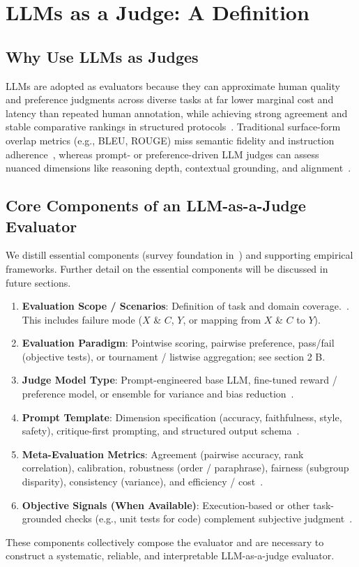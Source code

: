 \section{LLMs as a Judge: A Definition}

\subsection{Why Use LLMs as Judges}
LLMs are adopted as evaluators because they can approximate human quality and preference judgments across diverse tasks at far lower marginal cost and latency than repeated human annotation, while achieving strong agreement and stable comparative rankings in structured protocols~\cite{li2024_llmsasjudges, zheng2023judgelm, bavaresco2024judgebench}. Traditional surface-form overlap metrics (e.g., BLEU, ROUGE) miss semantic fidelity and instruction adherence~\cite{papineni2002bleu, lin2004rouge}, whereas prompt- or preference-driven LLM judges can assess nuanced dimensions like reasoning depth, contextual grounding, and alignment~\cite{fu2023gptscore, stiennon2020learning, ouyang2022training}.

\subsection{Core Components of an LLM-as-a-Judge Evaluator}
We distill essential components (survey foundation in~\cite{li2024_llmsasjudges}) and supporting empirical frameworks. Further detail on the essential components will be discussed in future sections.
\begin{enumerate}
	\item \textbf{Evaluation Scope / Scenarios}: Definition of task and domain coverage.~\cite{liang2022helm, srivastava2022bigbench}. This includes failure mode ($X$ \& $C$, $Y$, or mapping from $X$ \& $C$ to $Y$).
	\item \textbf{Evaluation Paradigm}: Pointwise scoring, pairwise preference, pass/fail (objective tests), or tournament / listwise aggregation; see section 2 B.
	\item \textbf{Judge Model Type}: Prompt-engineered base LLM, fine-tuned reward / preference model, or ensemble for variance and bias reduction~\cite{zhu2023judgelm, bavaresco2024judgebench}.
	\item \textbf{Prompt Template}: Dimension specification (accuracy, faithfulness, style, safety), critique-first prompting, and structured output schema~\cite{fu2023gptscore, li2024_llmsasjudges}.
	\item \textbf{Meta-Evaluation Metrics}: Agreement (pairwise accuracy, rank correlation), calibration, robustness (order / paraphrase), fairness (subgroup disparity), consistency (variance), and efficiency / cost~\cite{bavaresco2024judgebench, hada2024metal, li2024_llmsasjudges}.
	\item \textbf{Objective Signals (When Available)}: Execution-based or other task-grounded checks (e.g., unit tests for code) complement subjective judgment~\cite{chen2021evaluating, li2024_llmsasjudges}.
\end{enumerate} 

These components collectively compose the evaluator and are necessary to construct a systematic, reliable, and interpretable LLM-as-a-judge evaluator.